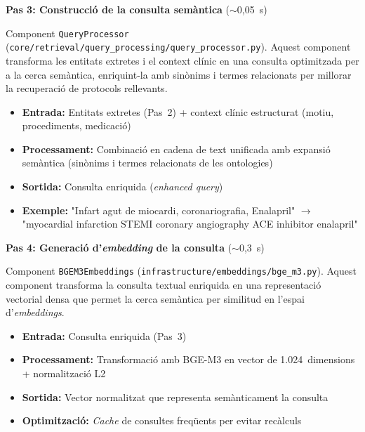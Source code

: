 \documentclass[CAT]{TFUOC}%
\begin{document}
\vspace{0.4em}

\textbf{Pas 3: Construcció de la consulta semàntica} ($\sim$0,05~s)

Component \texttt{QueryProcessor} (\texttt{core/retrieval/query\_processing/query\_processor.py}). Aquest component transforma les entitats extretes i el context clínic en una consulta optimitzada per a la cerca semàntica, enriquint-la amb sinònims i termes relacionats per millorar la recuperació de protocols rellevants.

\begin{itemize}
    \setlength{\itemsep}{0.3em}
    \item \textbf{Entrada:} Entitats extretes (Pas~2) + context clínic estructurat (motiu, procediments, medicació)
    \item \textbf{Processament:} Combinació en cadena de text unificada amb expansió semàntica (sinònims i termes relacionats de les ontologies)
    \item \textbf{Sortida:} Consulta enriquida (\textit{enhanced query})
    \item \textbf{Exemple:} "Infart agut de miocardi, coronariografia, Enalapril" $\rightarrow$ "myocardial infarction STEMI coronary angiography ACE inhibitor enalapril"
\end{itemize}

\vspace{0.4em}

\textbf{Pas 4: Generació d'\textit{embedding} de la consulta} ($\sim$0,3~s)

Component \texttt{BGEM3Embeddings} (\texttt{infrastructure/embeddings/bge\_m3.py}). Aquest component transforma la consulta textual enriquida en una representació vectorial densa que permet la cerca semàntica per similitud en l'espai d'\textit{embeddings}.

\begin{itemize}
    \setlength{\itemsep}{0.3em}
    \item \textbf{Entrada:} Consulta enriquida (Pas~3)
    \item \textbf{Processament:} Transformació amb BGE-M3 en vector de 1.024~dimensions + normalització L2
    \item \textbf{Sortida:} Vector normalitzat que representa semànticament la consulta
    \item \textbf{Optimització:} \textit{Cache} de consultes freqüents per evitar recàlculs
\end{itemize}
\end{document}
